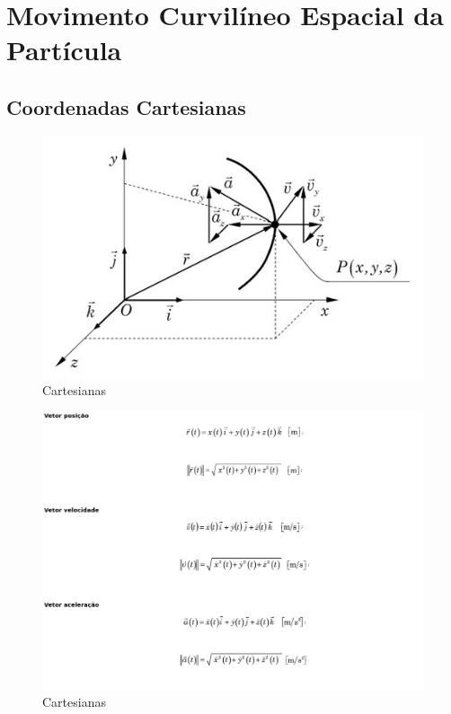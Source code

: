 \documentclass[a4paper, 12pt]{article}
\begin{document}
\section{Movimento Curvilíneo Espacial da Partícula}
	\subsection{Coordenadas Cartesianas}
		\begin{figure}[h]
			\center
			\includegraphics[scale=0.5]{imagens/cc.png} 
			\caption{Cartesianas}
		\end{figure}	
		\newpage
		\begin{figure}[h]
			\center
			\includegraphics[scale=0.6]{imagens/ccc.png} 
			\caption{Cartesianas}
		\end{figure}
\end{document}
